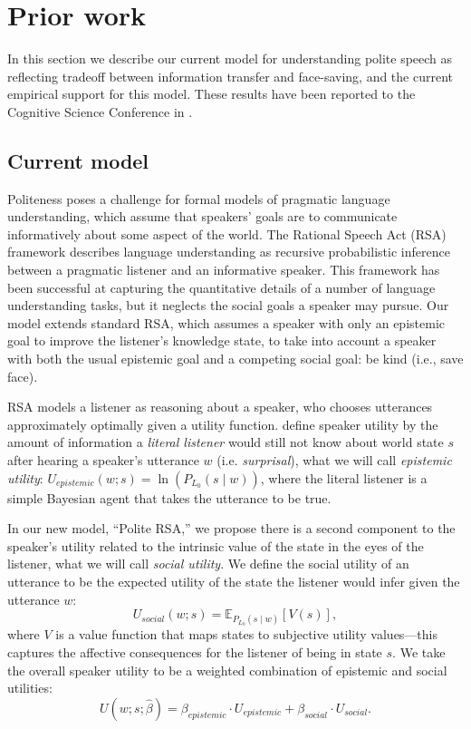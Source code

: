 \section{Prior work}
In this section we describe our current model for understanding polite speech as reflecting tradeoff between information transfer and face-saving, and the current empirical support for this model. These results have been reported to the Cognitive Science Conference in \citet{yoon2016}. 

\subsection{Current model}

Politeness poses a challenge for formal models of pragmatic language understanding, which assume that speakers' goals are to communicate informatively about some aspect of the world. The Rational Speech Act (RSA) framework \citep{Frank2012, Goodman2013} describes language understanding as recursive probabilistic inference between a pragmatic listener and an informative speaker. This framework has been successful at capturing the quantitative details of a number of language understanding tasks, but it neglects the social goals a speaker may pursue. Our model extends standard RSA, which assumes a speaker with only an epistemic goal to improve the listener's knowledge state, to take into account a speaker with both the usual epistemic goal and a competing social goal: be kind (i.e., save face).

RSA models a listener as reasoning about a speaker, who chooses utterances approximately optimally given a utility function. \citet{Goodman2013} define speaker utility by the amount of information a \emph{literal listener} would still not know about world state $s$ after hearing a speaker's utterance $w$ (i.e. \emph{surprisal}), what we will call \emph{epistemic utility}:
$U_{epistemic}(w; s) = \ln(P_{L_0}(s \mid w)) $,
where the literal listener is a simple Bayesian agent that takes the utterance to be true.

In our new model, ``Polite RSA,'' we propose there is a second component to the speaker's utility related to the intrinsic value of the state in the eyes of the listener, what we will call \emph{social utility}.
We define the social utility of an utterance to be the expected utility of the state the listener would infer given the utterance $w$:
$$
U_{social}(w; s) = \mathbb{E}_{P_{L_0}(s \mid w)}[V(s)],
$$
%
where $V$ is a value function that maps states to subjective utility values---this captures the affective consequences for the listener of being in state $s$.
%
We take the overall speaker utility to be a weighted combination of epistemic and social utilities:
$$
U(w;s;  \hat{\beta}) = \beta_{epistemic}\cdot U_{epistemic} + \beta_{social} \cdot U_{social}.
$$

